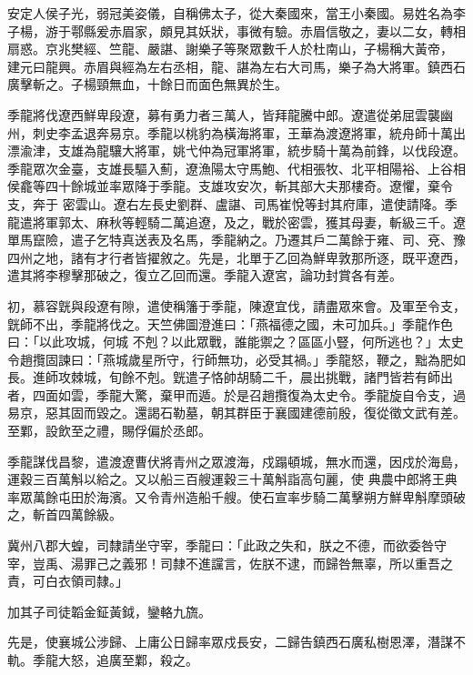 \begin{pinyinscope}
 安定人侯子光，弱冠美姿儀，自稱佛太子，從大秦國來，當王小秦國。易姓名為李子楊，游于鄠縣爰赤眉家，頗見其妖狀，事微有驗。赤眉信敬之，妻以二女，轉相扇惑。京兆樊經、竺龍、嚴諶、謝樂子等聚眾數千人於杜南山，子楊稱大黃帝，
 建元曰龍興。赤眉與經為左右丞相，龍、諶為左右大司馬，樂子為大將軍。鎮西石廣擊斬之。子楊頸無血，十餘日而面色無異於生。



 季龍將伐遼西鮮卑段遼，募有勇力者三萬人，皆拜龍騰中郎。遼遣從弟屈雲襲幽州，刺史李孟退奔易京。季龍以桃豹為橫海將軍，王華為渡遼將軍，統舟師十萬出漂渝津，支雄為龍驤大將軍，姚弋仲為冠軍將軍，統步騎十萬為前鋒，以伐段遼。季龍眾次金臺，支雄長驅入薊，遼漁陽太守馬鮑、代相張牧、北平相陽裕、上谷相侯龕等四十餘城並率眾降于季龍。支雄攻安次，斬其部大夫那樓奇。遼懼，棄令支，奔于
 密雲山。遼右左長史劉群、盧諶、司馬崔悅等封其府庫，遣使請降。季龍遣將軍郭太、麻秋等輕騎二萬追遼，及之，戰於密雲，獲其母妻，斬級三千。遼單馬竄險，遣子乞特真送表及名馬，季龍納之。乃遷其戶二萬餘于雍、司、兗、豫四州之地，諸有才行者皆擢敘之。先是，北單于乙回為鮮卑敦那所逐，既平遼西，遣其將李穆擊那破之，復立乙回而還。季龍入遼宮，論功封賞各有差。



 初，慕容皝與段遼有隙，遣使稱籓于季龍，陳遼宜伐，請盡眾來會。及軍至令支，皝師不出，季龍將伐之。天竺佛圖澄進曰：「燕福德之國，未可加兵。」季龍作色曰：「以此攻城，何城
 不剋？以此眾戰，誰能禦之？區區小豎，何所逃也？」太史令趙攬固諫曰：「燕城歲星所守，行師無功，必受其禍。」季龍怒，鞭之，黜為肥如長。進師攻棘城，旬餘不剋。皝遣子恪帥胡騎二千，晨出挑戰，諸門皆若有師出者，四面如雲，季龍大驚，棄甲而遁。於是召趙攬復為太史令。季龍旋自令支，過易京，惡其固而毀之。還謁石勒墓，朝其群臣于襄國建德前殷，復從徵文武有差。至鄴，設飲至之禮，賜俘偏於丞郎。



 季龍謀伐昌黎，遣渡遼曹伏將青州之眾渡海，戍蹋頓城，無水而還，因戍於海島，運穀三百萬斛以給之。又以船三百艘運穀三十萬斛詣高句麗，使
 典農中郎將王典率眾萬餘屯田於海濱。又令青州造船千艘。使石宣率步騎二萬擊朔方鮮卑斛摩頭破之，斬首四萬餘級。



 冀州八郡大蝗，司隸請坐守宰，季龍曰：「此政之失和，朕之不德，而欲委咎守宰，豈禹、湯罪己之義邪！司隸不進讜言，佐朕不逮，而歸咎無辜，所以重吾之責，可白衣領司隸。」



 加其子司徒韜金鉦黃鉞，鑾輅九旒。



 先是，使襄城公涉歸、上庸公日歸率眾戍長安，二歸告鎮西石廣私樹恩澤，潛謀不軌。季龍大怒，追廣至鄴，殺之。




\end{pinyinscope}
